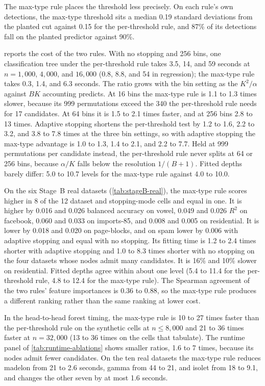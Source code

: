 The max-type rule places the threshold less precisely. On each rule's own
detections, the max-type threshold sits a median 0.19 standard deviations from the planted cut
against 0.15 for the per-threshold rule, and 87\% of its detections fall on
the planted predictor against 90\%.

 reports the cost of the two rules. With no stopping and
256 bins, one classification tree under the per-threshold rule takes 3.5, 14,
and 59 seconds at $n=1{,}000$, $4{,}000$, and $16{,}000$ (0.8, 8.8, and 54 in
regression); the max-type rule takes 0.3, 1.4, and 6.3 seconds. The ratio grows
with the bin setting as the $K^2/\alpha$ against $BK$ accounting predicts. At
16 bins the max-type rule is 1.1 to 1.3 times slower, because its 999
permutations exceed the 340 the per-threshold rule needs for 17 candidates. At
64 bins it is 1.5 to 2.1 times faster, and at 256 bins 2.8 to 13 times.
Adaptive stopping shortens the per-threshold test by 1.2 to 1.6, 2.2 to 3.2,
and 3.8 to 7.8 times at the three bin settings, so with adaptive stopping the
max-type advantage is 1.0 to 1.3, 1.4 to 2.1, and 2.2 to 7.7. Held at 999
permutations per candidate instead, the per-threshold rule never splits at 64
or 256 bins, because $\alpha/K$ falls below the resolution $1/(B+1)$. Fitted
depths barely differ: 5.0 to 10.7 levels for the max-type rule against 4.0 to
10.0.

On the six Stage~B real datasets (\cref{tab:stageB-real}), the max-type rule
scores higher in 8 of the 12 dataset and stopping-mode cells and equal in one.
It is higher by 0.016 and 0.026 balanced accuracy on vowel, 0.049 and 0.026
$R^2$ on facebook, 0.060 and 0.033 on imports-85, and 0.008 and 0.005 on
residential. It is lower by 0.018 and 0.020 on page-blocks, and on spam lower
by 0.006 with adaptive stopping and equal with no stopping. Its fitting time is
1.2 to 2.4 times shorter with adaptive stopping and 1.0 to 8.3 times shorter
with no stopping on the four datasets whose nodes admit many candidates. It is
16\% and 10\% slower on residential. Fitted depths agree within about one
level (5.4 to 11.4 for the per-threshold rule, 4.8 to 12.4 for the max-type
rule). The Spearman agreement of the two rules' feature importances is 0.36 to
0.88, so the max-type rule produces a different ranking rather than the same
ranking at lower cost.

In the head-to-head forest timing, the max-type rule is 10 to 27 times faster
than the per-threshold rule on the synthetic cells at $n\le 8{,}000$ and 21 to
36 times faster at $n=32{,}000$ (13 to 36 times on the cells that
\citet{MilletichDownesHirst2026citrees} tabulate). The runtime panel of
\cref{tab:runtime-ablations} shows smaller ratios, 1.6 to 7 times, because its
nodes admit fewer candidates. On the ten real datasets the max-type rule
reduces madelon from 21 to 2.6 seconds, gamma from 44 to 21, and isolet from 18
to 9.1, and changes the other seven by at most 1.6 seconds.

